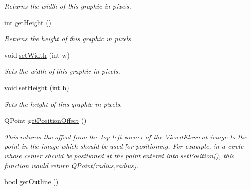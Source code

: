\begin{DoxyCompactItemize}
\begin{DoxyCompactList}\small\item\em Returns the width of this graphic in pixels. \end{DoxyCompactList}\item 
\hypertarget{class_picto_1_1_box_graphic_a0761e377c093f9bc1c0ada50b1df93c3}{int \hyperlink{class_picto_1_1_box_graphic_a0761e377c093f9bc1c0ada50b1df93c3}{get\-Height} ()}\label{class_picto_1_1_box_graphic_a0761e377c093f9bc1c0ada50b1df93c3}

\begin{DoxyCompactList}\small\item\em Returns the height of this graphic in pixels. \end{DoxyCompactList}\item 
\hypertarget{class_picto_1_1_box_graphic_aff43456a28b7db4a7f47bb1e3ce5d2c5}{void \hyperlink{class_picto_1_1_box_graphic_aff43456a28b7db4a7f47bb1e3ce5d2c5}{set\-Width} (int w)}\label{class_picto_1_1_box_graphic_aff43456a28b7db4a7f47bb1e3ce5d2c5}

\begin{DoxyCompactList}\small\item\em Sets the width of this graphic in pixels. \end{DoxyCompactList}\item 
\hypertarget{class_picto_1_1_box_graphic_ae064bb0f4af0ba025aacd9caaef3105f}{void \hyperlink{class_picto_1_1_box_graphic_ae064bb0f4af0ba025aacd9caaef3105f}{set\-Height} (int h)}\label{class_picto_1_1_box_graphic_ae064bb0f4af0ba025aacd9caaef3105f}

\begin{DoxyCompactList}\small\item\em Sets the height of this graphic in pixels. \end{DoxyCompactList}\item 
\hypertarget{class_picto_1_1_box_graphic_a04b9b9401bfb3472007f3fa962e0e7b4}{Q\-Point \hyperlink{class_picto_1_1_box_graphic_a04b9b9401bfb3472007f3fa962e0e7b4}{get\-Position\-Offset} ()}\label{class_picto_1_1_box_graphic_a04b9b9401bfb3472007f3fa962e0e7b4}

\begin{DoxyCompactList}\small\item\em This returns the offset from the top left corner of the \hyperlink{struct_picto_1_1_visual_element}{Visual\-Element} image to the point in the image which should be used for positioning. For example, in a circle whose center should be positioned at the point entered into \hyperlink{struct_picto_1_1_visual_element_a454cc96862097e96a0b0f1d2c83e23ed}{set\-Position()}, this function would return Q\-Point(radius,radius). \end{DoxyCompactList}\item 
\hypertarget{class_picto_1_1_box_graphic_a4cac8e70e0ec892fcbd2cb8c0e8f3731}{bool \hyperlink{class_picto_1_1_box_graphic_a4cac8e70e0ec892fcbd2cb8c0e8f3731}{get\-Outline} ()}\label{class_picto_1_1_box_graphic_a4cac8e70e0ec892fcbd2cb8c0e8f3731}


\end{DoxyCompactItemize}
